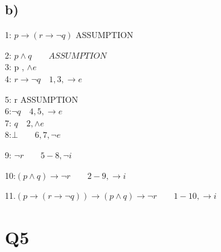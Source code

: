 \documentclass{article}
\begin{document}
\subsection{b)}
\begin{mdframed}[]
1: $ p\rightarrow (r \rightarrow \neg q)$ \quad \quad ASSUMPTION\\
\begin{mdframed}
2: $ p \land q  \quad \quad ASSUMPTION $\\
3: p \quad {}, $\land e$\\
4: $r\rightarrow \neg q \quad 1,3, \rightarrow e$\\
\begin{mdframed}[]
5: r \quad ASSUMPTION\\
6:$ \neg q \quad 4,5,\rightarrow e$ \\
7: $q \quad 2, \land e$\\
8:$ \bot \quad \quad 6,7,\neg e$\\
\end{mdframed}
9: $\neg r \quad \quad  5-8,\neg i $\\
\end{mdframed}
10:$(p \land q)\rightarrow \neg r \quad \quad 2-9, \rightarrow i$\\
\end{mdframed}
11.$ (p\rightarrow (r \rightarrow \neg q))\rightarrow (p \land q)\rightarrow \neg r \quad \quad 1-10, \rightarrow i$

\section{Q5}
\end{document}
